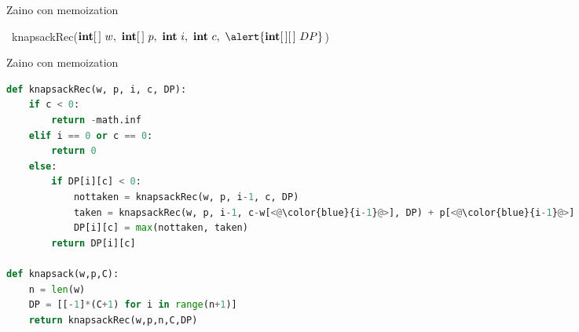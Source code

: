 \begin{frame}{Zaino con memoization}

\vspace{-9pt}
\begin{Procedure}
\caption[A]{\INTEGER\ \textsf{knapsackRec}($\INTARRAY\ w,\ \INTARRAY\ p,\  \INTEGER\ i,\ \INTEGER\ c,\ \alert{\INTARRAY[\,]\ DP}$)}

\end{Procedure}

\end{frame}



\begin{frame}[fragile,shrink=5]{Zaino con memoization}

\vspace{-9pt}
\begin{lstlisting}[language=python,tabsize=2]
def knapsackRec(w, p, i, c, DP):
	if c < 0:
		return -math.inf
	elif i == 0 or c == 0:
		return 0
	else:
		if DP[i][c] < 0:
			nottaken = knapsackRec(w, p, i-1, c, DP)
			taken = knapsackRec(w, p, i-1, c-w[<@\color{blue}{i-1}@>], DP) + p[<@\color{blue}{i-1}@>]
			DP[i][c] = max(nottaken, taken)
		return DP[i][c]

def knapsack(w,p,C):
	n = len(w)
	DP = [[-1]*(C+1) for i in range(n+1)]
	return knapsackRec(w,p,n,C,DP)
\end{lstlisting}

\end{frame}

